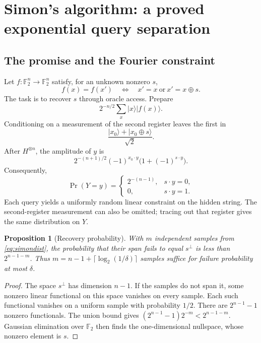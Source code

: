 \documentclass[11pt,a4paper]{article}
\newcommand{\ket}[1]{\lvert #1\rangle}
\newcommand{\F}{\mathbb F}
\newtheorem{proposition}[theorem]{Proposition}
\theoremstyle{definition}
\theoremstyle{remark}
\numberwithin{equation}{section}
\begin{document}
\section{Simon's algorithm: a proved exponential query separation}\label{sec:simon}
\subsection{The promise and the Fourier constraint}
Let $f:\F_2^n\to\F_2^n$ satisfy, for an unknown nonzero $s$,
\begin{equation}\label{eq:simonpromise}
 f(x)=f(x')\quad\Longleftrightarrow\quad
 x'=x\ \text{or}\ x'=x\oplus s.
\end{equation}
The task is to recover $s$ through oracle access. Prepare
\begin{equation}
 2^{-n/2}\sum_x\ket{x}\ket{f(x)}.
\end{equation}
Conditioning on a measurement of the second register leaves the first in
\begin{equation}
 \frac{\ket{x_0}+\ket{x_0\oplus s}}{\sqrt2}.
\end{equation}
After $H^{\otimes n}$, the amplitude of $y$ is
\begin{equation}
 2^{-(n+1)/2}(-1)^{x_0\cdot y}
 \bigl(1+(-1)^{s\cdot y}\bigr).
\end{equation}
Consequently,
\begin{equation}\label{eq:simondist}
 \Pr(Y=y)=
 \begin{cases}
  2^{-(n-1)},&s\cdot y=0,\\
  0,&s\cdot y=1.
 \end{cases}
\end{equation}
Each query yields a uniformly random linear constraint on the hidden
string. The second-register measurement can also be omitted; tracing out
that register gives the same distribution on $Y$.

\begin{proposition}[Recovery probability]
With $m$ independent samples from \eqref{eq:simondist}, the probability that
their span fails to equal $s^\perp$ is less than $2^{n-1-m}$.
Thus $m=n-1+\lceil\log_2(1/\delta)\rceil$ samples suffice for failure
probability at most $\delta$.
\end{proposition}
\begin{proof}
The space $s^\perp$ has dimension $n-1$. If the samples do not span it, some
nonzero linear functional on this space vanishes on every sample.
Each such functional vanishes on a uniform sample with probability $1/2$.
There are $2^{n-1}-1$ nonzero functionals. The union bound gives
$(2^{n-1}-1)2^{-m}<2^{n-1-m}$. Gaussian elimination over $\F_2$ then finds
the one-dimensional nullspace, whose nonzero element is $s$.
\end{proof}
\end{document}
